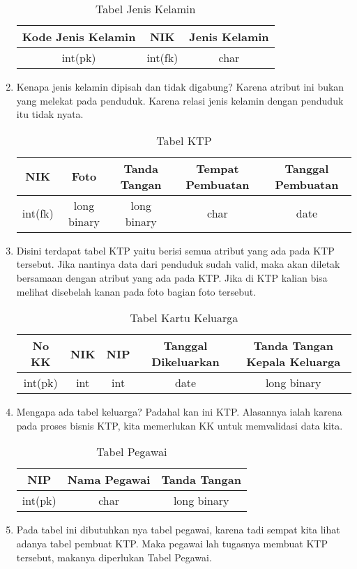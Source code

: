 \documentclass{article}
\begin{document}
\begin{enumerate}
\begin{table}[h]
\begin{center}
\begin{tabular}{|c|c|c|}
\hline
Kode Jenis Kelamin & NIK & Jenis Kelamin\\
\hline
int(pk) & int(fk) & char\\
\hline
\end{tabular}
\caption{Tabel Jenis Kelamin}
\end{center}
\end{table}
\item Kenapa jenis kelamin dipisah dan tidak digabung? Karena atribut ini bukan yang melekat pada penduduk. Karena relasi jenis kelamin dengan penduduk itu tidak nyata.

\newpage
\begin{table}[h]
\begin{center}
\begin{tabular}{|c|c|c|c|c|}
\hline
NIK & Foto & Tanda Tangan & Tempat Pembuatan & Tanggal Pembuatan\\
\hline
int(fk) & long binary & long binary & char & date\\
\hline
\end{tabular}
\caption{Tabel KTP}
\end{center}
\end{table}
\item Disini terdapat tabel KTP yaitu berisi semua atribut yang ada pada KTP tersebut. Jika nantinya data dari penduduk sudah valid, maka akan diletak bersamaan dengan atribut yang ada pada KTP. Jika di KTP kalian bisa melihat disebelah kanan pada foto bagian foto tersebut.

\begin{table}[h]
\begin{center}
\begin{tabular}{|c|c|c|c|c|}
\hline
No KK & NIK & NIP & Tanggal Dikeluarkan & Tanda Tangan Kepala Keluarga\\
\hline
int(pk) & int & int & date & long binary\\
\hline
\end{tabular}
\caption{Tabel Kartu Keluarga}
\end{center}
\end{table}
\item Mengapa ada tabel keluarga? Padahal kan ini KTP. Alasannya ialah karena pada proses bisnis KTP, kita memerlukan KK untuk memvalidasi data kita.

\begin{table}[h]
\begin{center}
\begin{tabular}{|c|c|c|}
\hline
NIP & Nama Pegawai & Tanda Tangan\\
\hline
int(pk) & char & long binary\\
\hline
\end{tabular}
\caption{Tabel Pegawai}
\end{center}
\end{table}
\item Pada tabel ini dibutuhkan nya tabel pegawai, karena tadi sempat kita lihat adanya tabel pembuat KTP. Maka pegawai lah tugasnya membuat KTP tersebut, makanya diperlukan Tabel Pegawai.


\end{enumerate}
\end{document}
